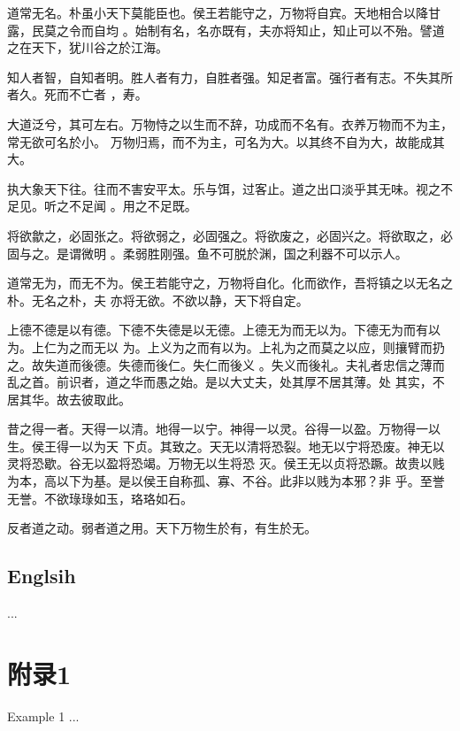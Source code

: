 \documentclass[a4paper, twoside, openany, extrafontsizes]{dlutthesis}
\begin{document}
道常无名。朴虽小天下莫能臣也。侯王若能守之，万物将自宾。天地相合以降甘露，民莫之令而自均
。始制有名，名亦既有，夫亦将知止，知止可以不殆。譬道之在天下，犹川谷之於江海。

知人者智，自知者明。胜人者有力，自胜者强。知足者富。强行者有志。不失其所者久。死而不亡者
，寿。

大道泛兮，其可左右。万物恃之以生而不辞，功成而不名有。衣养万物而不为主，常无欲可名於小。
万物归焉，而不为主，可名为大。以其终不自为大，故能成其大。

执大象天下往。往而不害安平太。乐与饵，过客止。道之出口淡乎其无味。视之不足见。听之不足闻
。用之不足既。

将欲歙之，必固张之。将欲弱之，必固强之。将欲废之，必固兴之。将欲取之，必固与之。是谓微明
。柔弱胜刚强。鱼不可脱於渊，国之利器不可以示人。

道常无为，而无不为。侯王若能守之，万物将自化。化而欲作，吾将镇之以无名之朴。无名之朴，夫
亦将无欲。不欲以静，天下将自定。

上德不德是以有德。下德不失德是以无德。上德无为而无以为。下德无为而有以为。上仁为之而无以
为。上义为之而有以为。上礼为之而莫之以应，则攘臂而扔之。故失道而後德。失德而後仁。失仁而後义
。失义而後礼。夫礼者忠信之薄而乱之首。前识者，道之华而愚之始。是以大丈夫，处其厚不居其薄。处
其实，不居其华。故去彼取此。

昔之得一者。天得一以清。地得一以宁。神得一以灵。谷得一以盈。万物得一以生。侯王得一以为天
下贞。其致之。天无以清将恐裂。地无以宁将恐废。神无以灵将恐歇。谷无以盈将恐竭。万物无以生将恐
灭。侯王无以贞将恐蹶。故贵以贱为本，高以下为基。是以侯王自称孤、寡、不谷。此非以贱为本邪？非
乎。至誉无誉。不欲琭琭如玉，珞珞如石。

反者道之动。弱者道之用。天下万物生於有，有生於无。

\section{Englsih}
\label{sec:englsih}

\lipsum[1-9]


\printpagenotes
\begin{thebibliography}
	...
\end{thebibliography}
\appendix
\chapter{附录1}{Example 1}
...
\backmatter
\end{document}
